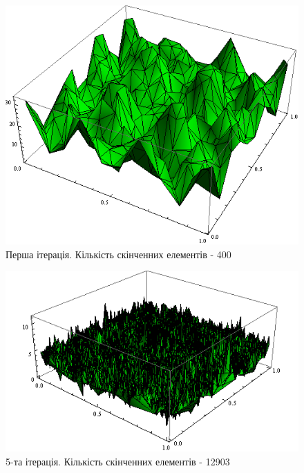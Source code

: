 \begin{figure}[H]
	\centering
    \includegraphics[scale=0.8]{problem1/my/AEE/1}
    \caption{Перша ітерація. Кількість скінченних елементів - 400}
    \label{fig:p1_aee1}
\end{figure}

\begin{figure}[H]
	\centering
    \includegraphics[scale=0.85]{problem1/my/AEE/5}
    \caption{5-та ітерація. Кількість скінченних елементів - 12903}
    \label{fig:p1_aee5}
\end{figure}

